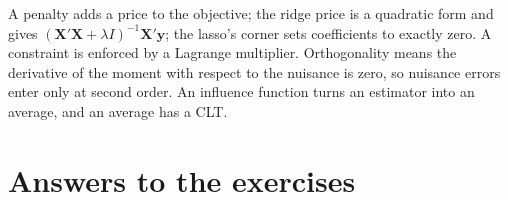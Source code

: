 \documentclass[11pt]{article}
\theoremstyle{definition}
\newcommand{\X}{\bm{X}}
\newcommand{\Y}{\bm{y}}
\begin{document}
\begin{takeaway}
A penalty adds a price to the objective; the ridge price is a quadratic
form and gives $(\X'\X + \lambda I)^{-1}\X'\Y$; the lasso's corner sets
coefficients to exactly zero. A constraint is enforced by a Lagrange
multiplier. Orthogonality means the derivative of the moment with respect
to the nuisance is zero, so nuisance errors enter only at second order. An
influence function turns an estimator into an average, and an average has
a CLT.
\end{takeaway}

\section*{Answers to the exercises}
\end{document}

